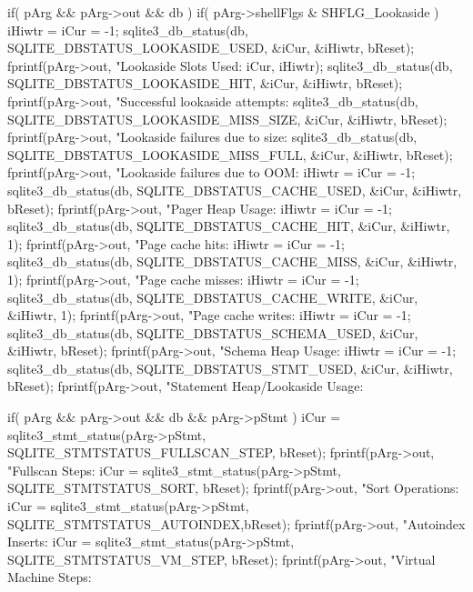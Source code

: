 \begin{Codex}[label=shell.c,numbers=left]
{{  if( pArg && pArg->out && db ){
    if( pArg->shellFlgs & SHFLG_Lookaside ){
      iHiwtr = iCur = -1;
      sqlite3_db_status(db, SQLITE_DBSTATUS_LOOKASIDE_USED,
                        &iCur, &iHiwtr, bReset);
      fprintf(pArg->out, "Lookaside Slots Used:                %
              iCur, iHiwtr);
      sqlite3_db_status(db, SQLITE_DBSTATUS_LOOKASIDE_HIT,
                        &iCur, &iHiwtr, bReset);
      fprintf(pArg->out, "Successful lookaside attempts:       %
      sqlite3_db_status(db, SQLITE_DBSTATUS_LOOKASIDE_MISS_SIZE,
                        &iCur, &iHiwtr, bReset);
      fprintf(pArg->out, "Lookaside failures due to size:      %
      sqlite3_db_status(db, SQLITE_DBSTATUS_LOOKASIDE_MISS_FULL,
                        &iCur, &iHiwtr, bReset);
      fprintf(pArg->out, "Lookaside failures due to OOM:       %
    }
    iHiwtr = iCur = -1;
    sqlite3_db_status(db, SQLITE_DBSTATUS_CACHE_USED, &iCur, &iHiwtr, bReset);
    fprintf(pArg->out, "Pager Heap Usage:                    %
    iHiwtr = iCur = -1;
    sqlite3_db_status(db, SQLITE_DBSTATUS_CACHE_HIT, &iCur, &iHiwtr, 1);
    fprintf(pArg->out, "Page cache hits:                     %
    iHiwtr = iCur = -1;
    sqlite3_db_status(db, SQLITE_DBSTATUS_CACHE_MISS, &iCur, &iHiwtr, 1);
    fprintf(pArg->out, "Page cache misses:                   %
    iHiwtr = iCur = -1;
    sqlite3_db_status(db, SQLITE_DBSTATUS_CACHE_WRITE, &iCur, &iHiwtr, 1);
    fprintf(pArg->out, "Page cache writes:                   %
    iHiwtr = iCur = -1;
    sqlite3_db_status(db, SQLITE_DBSTATUS_SCHEMA_USED, &iCur, &iHiwtr, bReset);
    fprintf(pArg->out, "Schema Heap Usage:                   %
    iHiwtr = iCur = -1;
    sqlite3_db_status(db, SQLITE_DBSTATUS_STMT_USED, &iCur, &iHiwtr, bReset);
    fprintf(pArg->out, "Statement Heap/Lookaside Usage:      %
  }

  if( pArg && pArg->out && db && pArg->pStmt ){
    iCur = sqlite3_stmt_status(pArg->pStmt, SQLITE_STMTSTATUS_FULLSCAN_STEP,
                               bReset);
    fprintf(pArg->out, "Fullscan Steps:                      %
    iCur = sqlite3_stmt_status(pArg->pStmt, SQLITE_STMTSTATUS_SORT, bReset);
    fprintf(pArg->out, "Sort Operations:                     %
    iCur = sqlite3_stmt_status(pArg->pStmt, SQLITE_STMTSTATUS_AUTOINDEX,bReset);
    fprintf(pArg->out, "Autoindex Inserts:                   %
    iCur = sqlite3_stmt_status(pArg->pStmt, SQLITE_STMTSTATUS_VM_STEP, bReset);
    fprintf(pArg->out, "Virtual Machine Steps:               %
  }

}}
\end{Codex}
